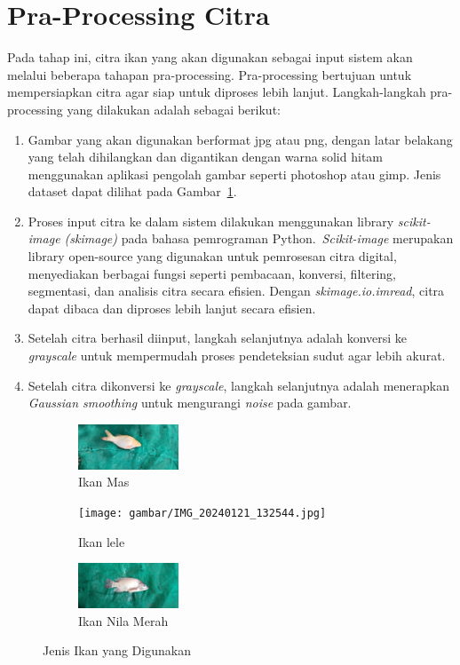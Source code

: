\section{Pra-Processing Citra}
    Pada tahap ini, citra ikan yang akan digunakan sebagai input sistem akan melalui beberapa tahapan pra-processing.
Pra-processing bertujuan untuk mempersiapkan citra agar siap untuk diproses lebih lanjut. Langkah-langkah pra-processing yang dilakukan adalah sebagai berikut:
\begin{enumerate}
    \item Gambar yang akan digunakan berformat jpg atau png, dengan latar belakang yang telah dihilangkan dan digantikan dengan warna solid hitam menggunakan aplikasi pengolah gambar seperti photoshop atau gimp. Jenis dataset dapat dilihat pada Gambar~\ref{fig:dataset}.
    \item Proses input citra ke dalam sistem dilakukan menggunakan library \emph{scikit-image (skimage)} pada bahasa pemrograman Python.~\emph{Scikit-image} merupakan library open-source yang digunakan untuk pemrosesan citra digital, menyediakan berbagai fungsi seperti pembacaan, konversi, filtering, segmentasi, dan analisis citra secara efisien. Dengan \emph{skimage.io.imread}, citra dapat dibaca dan diproses lebih lanjut secara efisien.
    \item Setelah citra berhasil diinput, langkah selanjutnya adalah konversi ke \emph{grayscale} untuk mempermudah proses pendeteksian sudut agar lebih akurat.
    \item Setelah citra dikonversi ke \emph{grayscale}, langkah selanjutnya adalah menerapkan \emph{Gaussian smoothing} untuk mengurangi \emph{noise} pada gambar.
\end{enumerate}

\begin{figure}
	\centering
	\begin{subfigure}{.3\textwidth}
		\centering
        \includegraphics[keepaspectratio, width=3cm]{gambar/IMG_20240121_131125.jpg}
		\caption{Ikan Mas}
	\end{subfigure}
	\begin{subfigure}{.3\textwidth}
		\centering
		\texttt{[image: gambar/IMG\_20240121\_132544.jpg]}
		\caption{Ikan lele}
	\end{subfigure} 
	\begin{subfigure}{.3\textwidth}
		\centering
		\includegraphics[keepaspectratio, width=3cm]{gambar/IMG_20240121_140044.jpg}
		\caption{Ikan Nila Merah}
	\end{subfigure}
	\caption{Jenis Ikan yang Digunakan}\label{fig:dataset}
\end{figure}

